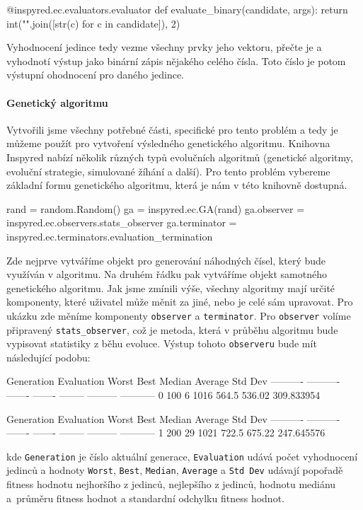\begin{code}
@inspyred.ec.evaluators.evaluator
def evaluate_binary(candidate, args):
    return int("".join([str(c) for c in candidate]), 2)
\end{code}

Vyhodnocení jedince tedy vezme všechny prvky jeho vektoru, přečte je a
vyhodnotí výstup jako binární zápis nějakého celého čísla. Toto číslo je potom
výstupní ohodnocení pro daného jedince.

\paragraph{Genetický algoritmu}
Vytvořili jsme všechny potřebné části, specifické pro tento problém a tedy je
můžeme použít pro vytvoření výsledného genetického algoritmu. Knihovna Inspyred
nabízí několik různých typů evolučních algoritmů (genetické algoritmy, evoluční
strategie, simulované žíhání a další). Pro tento problém vybereme
základní formu genetického algoritmu, která je nám v této knihovně dostupná.

\begin{code}
rand = random.Random()
ga = inspyred.ec.GA(rand)
ga.observer = inspyred.ec.observers.stats_observer
ga.terminator = inspyred.ec.terminators.evaluation_termination
\end{code}

Zde nejprve vytváříme objekt pro generování náhodných čísel, který bude
využíván v algoritmu. Na druhém řádku pak vytváříme objekt samotného
genetického algoritmu. Jak jsme zmínili výše, všechny algoritmy mají určité
komponenty, které uživatel může měnit za jiné, nebo je celé sám upravovat. Pro
ukázku zde měníme komponenty \texttt{observer} a \texttt{terminator}. Pro
\texttt{observer} volíme připravený \texttt{stats\_observer}, což je metoda,
která v průběhu algoritmu bude vypisovat statistiky z běhu evoluce. Výstup
tohoto \texttt{observeru} bude mít následující podobu:

\begin{code}
Generation Evaluation   Worst    Best   Median   Average     Std Dev
---------- ---------- ------- ------- -------- --------- -----------      
         0        100       6    1016    564.5    536.02  309.833954

Generation Evaluation   Worst    Best   Median   Average     Std Dev
---------- ---------- ------- ------- -------- --------- -----------     
         1        200      29    1021    722.5    675.22  247.645576
\end{code}
kde \texttt{Generation} je číslo aktuální generace, \texttt{Evaluation} udává
počet vyhodnocení jedinců a hodnoty \texttt{Worst}, \texttt{Best},
\texttt{Median}, \texttt{Average} a \texttt{Std Dev} udávají popořadě fitness
hodnotu nejhoršího z jedinců, nejlepšího z jedinců, hodnotu mediánu a~průměru
fitness hodnot a standardní odchylku fitness hodnot.

